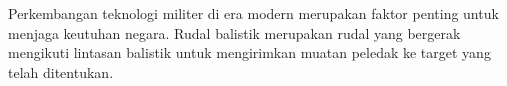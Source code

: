 Perkembangan teknologi militer di era modern merupakan faktor penting untuk menjaga keutuhan negara. Rudal balistik merupakan rudal yang bergerak mengikuti lintasan balistik untuk mengirimkan muatan peledak ke target yang telah ditentukan. 
